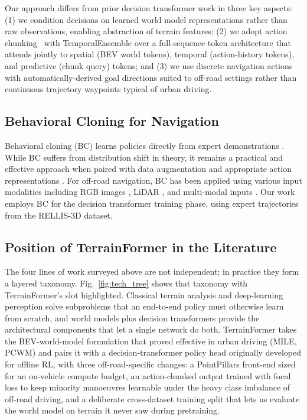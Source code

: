 \documentclass[sensors,article,submit,pdftex,moreauthors]{Definitions/mdpi}
\begin{document}
Our approach differs from prior decision transformer work in three key aspects: (1) we condition decisions on learned world model representations rather than raw observations, enabling abstraction of terrain features; (2) we adopt action chunking~\cite{zhao2023act} with TemporalEnsemble over a full-sequence token architecture that attends jointly to spatial (BEV world tokens), temporal (action-history tokens), and predictive (chunk query) tokens; and (3) we use discrete navigation actions with automatically-derived goal directions suited to off-road settings rather than continuous trajectory waypoints typical of urban driving.

\subsection{Behavioral Cloning for Navigation}

Behavioral cloning (BC) learns policies directly from expert demonstrations \cite{pomerleau1989, bojarski2016}. While BC suffers from distribution shift in theory, it remains a practical and effective approach when paired with data augmentation and appropriate action representations \cite{codevilla2018}. For off-road navigation, BC has been applied using various input modalities including RGB images \cite{kahn2021}, LiDAR \cite{wigness2019}, and multi-modal inputs \cite{triest2023}. Our work employs BC for the decision transformer training phase, using expert trajectories from the RELLIS-3D dataset.

\subsection{Position of TerrainFormer in the Literature}
\label{sec:lit_position}

The four lines of work surveyed above are not independent; in practice they form a layered taxonomy. Fig.~\ref{fig:tech_tree} shows that taxonomy with TerrainFormer's slot highlighted. Classical terrain analysis and deep-learning perception solve subproblems that an end-to-end policy must otherwise learn from scratch, and world models plus decision transformers provide the architectural components that let a single network do both. TerrainFormer takes the BEV-world-model formulation that proved effective in urban driving (MILE, PCWM) and pairs it with a decision-transformer policy head originally developed for offline RL, with three off-road-specific changes: a PointPillars front-end sized for an on-vehicle compute budget, an action-chunked output trained with focal loss to keep minority manoeuvres learnable under the heavy class imbalance of off-road driving, and a deliberate cross-dataset training split that lets us evaluate the world model on terrain it never saw during pretraining.
\end{document}
